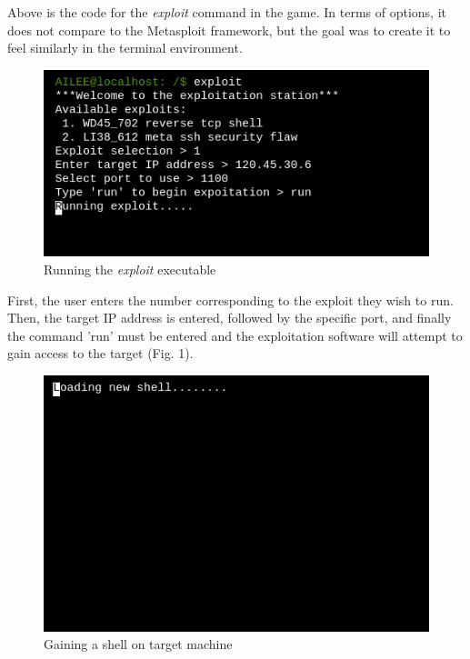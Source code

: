 \documentclass[conference]{IEEEtran}
\begin{document}


Above is the code for the \textit{exploit} command in the game. In terms of options, it does not compare to the Metasploit framework, but the goal was to create it to feel similarly in the terminal environment.

\begin{figure}[htbp]
	\centerline{\includegraphics[scale=2]{exploit-pic}}
	\caption{Running the \textit{exploit} executable}
	\label{fig}
\end{figure}

First, the user enters the number corresponding to the exploit they wish to run. Then, the target IP address is entered, followed by the specific port, and finally the command 'run' must be entered and the exploitation software will attempt to gain access to the target (Fig. 1). 

\begin{figure}[htbp]
	\centerline{\includegraphics[scale=2]{loading-new-shell}}
	\caption{Gaining a shell on target machine}
	\label{fig}
\end{figure}
\end{document}
